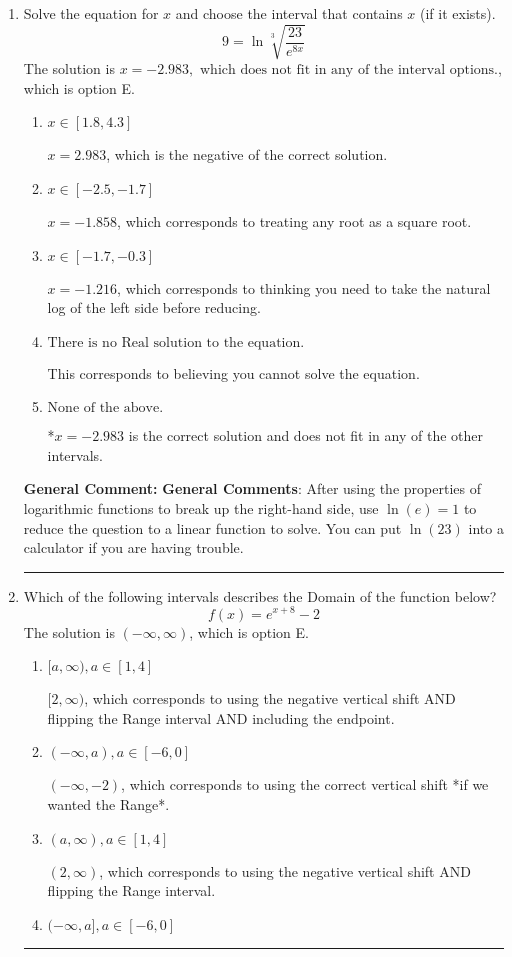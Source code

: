 \documentclass{extbook}[14pt]
\newcommand{\litem}[1]{\item #1

\rule{\textwidth}{0.4pt}}
\begin{document}
\begin{enumerate}\litem{
 Solve the equation for $x$ and choose the interval that contains $x$ (if it exists).
\[  9 = \ln{\sqrt[3]{\frac{23}{e^{8x}}}} \]The solution is \( x = -2.983, \text{ which does not fit in any of the interval options.} \), which is option E.\begin{enumerate}[label=\Alph*.]
\item \( x \in [1.8, 4.3] \)

$x = 2.983$, which is the negative of the correct solution.
\item \( x \in [-2.5, -1.7] \)

$x = -1.858$, which corresponds to treating any root as a square root.
\item \( x \in [-1.7, -0.3] \)

$x = -1.216$, which corresponds to thinking you need to take the natural log of the left side before reducing.
\item \( \text{There is no Real solution to the equation.} \)

This corresponds to believing you cannot solve the equation.
\item \( \text{None of the above.} \)

*$x = -2.983$ is the correct solution and does not fit in any of the other intervals.
\end{enumerate}

\textbf{General Comment:} \textbf{General Comments}: After using the properties of logarithmic functions to break up the right-hand side, use $\ln(e) = 1$ to reduce the question to a linear function to solve. You can put $\ln(23)$ into a calculator if you are having trouble.
}
\litem{
Which of the following intervals describes the Domain of the function below?
\[ f(x) = e^{x+8}-2 \]The solution is \( (-\infty, \infty) \), which is option E.\begin{enumerate}[label=\Alph*.]
\item \( [a, \infty), a \in [1, 4] \)

$[2, \infty)$, which corresponds to using the negative vertical shift AND flipping the Range interval AND including the endpoint.
\item \( (-\infty, a), a \in [-6, 0] \)

$(-\infty, -2)$, which corresponds to using the correct vertical shift *if we wanted the Range*.
\item \( (a, \infty), a \in [1, 4] \)

$(2, \infty)$, which corresponds to using the negative vertical shift AND flipping the Range interval.
\item \( (-\infty, a], a \in [-6, 0] \)


\end{enumerate}}
\end{enumerate}
\end{document}
